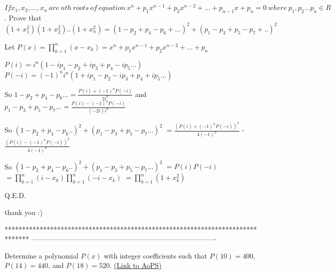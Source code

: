 \begin{solution}
	\begin{tcolorbox}$ If x_1 ,x_2,...,x_n \ are \ nth \ roots \ of \ equation \ x^n + p_1 x^{n - 1} + p_2 x^{n - 2} + ... + p_{n - 1}x + p_n = 0 \ where \ p_1,p_2...p_n \in R$ .
Prove that $ (1 + x_1 ^2)(1 + x_2 ^2)..(1 + x_n ^2) = (1 - p_2 + p_4 - p_6 + ...)^2 + (p_1 - p_3 + p_5 - p_7 + ..)^2$\end{tcolorbox}

Let $ P(x)=\prod_{k=1}^n(x-x_k)=x^n+p_1x^{n-1}+p_2x^{n-2}+...+p_n$

$ P(i)=i^n(1-ip_1-p_2+ip_3+p_4-ip_5 ...)$
$ P(-i)=(-1)^ni^n(1+ip_1-p_2-ip_3+p_4+ip_5...)$

So $ 1-p_2+p_4-p_6...=\frac{P(i)+(-1)^nP(-i)}{2i^n}$ and $ p_1-p_3+p_5-p_7...=\frac{P(i)-(-1)^nP(-i)}{(-2i)i^n}$

So $ (1-p_2+p_4-p_6..)^2+(p_1-p_3+p_5-p_7...)^2$ $ =\frac{(P(i)+(-1)^nP(-i))^2}{4(-1)^n}$ - $ \frac{(P(i)-(-1)^nP(-i))^2}{4(-1)^n}$

So $ (1-p_2+p_4-p_6..)^2+(p_1-p_3+p_5-p_7...)^2$ $ =P(i)P(-i)$ $ =\prod_{k=1}^n(i-x_k)\prod_{k=1}^n(-i-x_k)$ $ =\prod_{k=1}^n(1+x_k^2)$

Q.E.D.
\end{solution}



\begin{solution}
	thank you  :)
\end{solution}
*******************************************************************************
-------------------------------------------------------------------------------

\begin{problem}
	Determine a polynomial $ P(x)$ with integer coefficients such that $ P(10) = 400$, $ P(14) = 440$, and $ P(18) = 520$.
	\flushright \href{https://artofproblemsolving.com/community/c6h307264}{(Link to AoPS)}
\end{problem}






